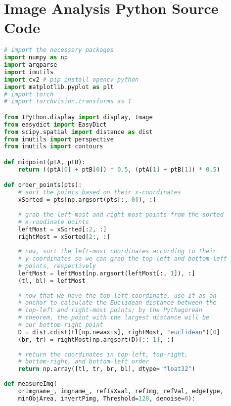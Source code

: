 
\chapter{Image Analysis Python Source Code} %

\label{Appendix_ImageAnalysisCode} %

\begin{lstlisting}[language=Python, caption=Image Analysis Source Code, label=lis:imageAnalysisSourceCode]
# import the necessary packages
import numpy as np
import argparse
import imutils
import cv2 # pip install opencv-python
import matplotlib.pyplot as plt
# import torch
# import torchvision.transforms as T

from IPython.display import display, Image
from easydict import EasyDict
from scipy.spatial import distance as dist
from imutils import perspective
from imutils import contours

def midpoint(ptA, ptB):
    return ((ptA[0] + ptB[0]) * 0.5, (ptA[1] + ptB[1]) * 0.5)

def order_points(pts):
    # sort the points based on their x-coordinates
    xSorted = pts[np.argsort(pts[:, 0]), :]
    
    # grab the left-most and right-most points from the sorted
    # x-roodinate points
    leftMost = xSorted[:2, :]
    rightMost = xSorted[2:, :]
    
    # now, sort the left-most coordinates according to their
    # y-coordinates so we can grab the top-left and bottom-left
    # points, respectively
    leftMost = leftMost[np.argsort(leftMost[:, 1]), :]
    (tl, bl) = leftMost
    
    # now that we have the top-left coordinate, use it as an
    # anchor to calculate the Euclidean distance between the
    # top-left and right-most points; by the Pythagorean
    # theorem, the point with the largest distance will be
    # our bottom-right point
    D = dist.cdist(tl[np.newaxis], rightMost, "euclidean")[0]
    (br, tr) = rightMost[np.argsort(D)[::-1], :]
    
    # return the coordinates in top-left, top-right,
    # bottom-right, and bottom-left order
    return np.array([tl, tr, br, bl], dtype="float32")
    
def measureImg(
    orimgname_, imgname_, refIsXval, refImg, refVal, edgeType, 
    minObjArea, invertPimg, Threshold=128, denoise=0):
    

\end{lstlisting}

